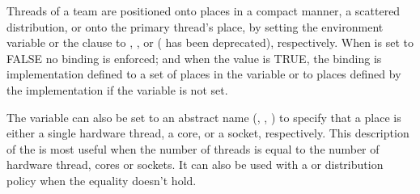 
Threads of a team are positioned onto places in a compact manner, a 
scattered distribution, or onto the primary thread's place, by setting the 
 environment variable or the  clause  to 
, , or  ( has been deprecated), respectively.  When 
 is set to FALSE no binding is enforced; and 
when the value is TRUE, the binding is implementation defined to 
a set of places in the  variable or to places 
defined by the implementation if the  variable 
is not set. 

The  variable can also be set to an abstract name 
(, , ) to specify that a place is
either a single hardware thread, a core, or a socket, respectively. 
This description of the  is most useful when the 
number of threads is equal to the number of hardware thread, cores
or sockets.  It can also be used with a  or  
distribution policy when the equality doesn't hold.




%   
%     

%   
%    
%     

